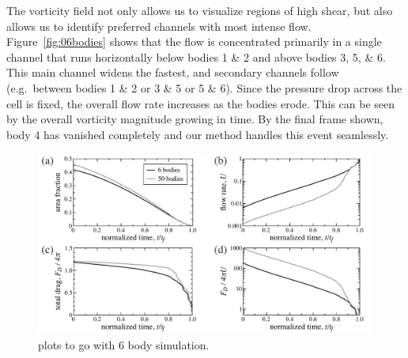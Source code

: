 \documentclass[preprint, 10pt]{elsarticle}
\begin{document}
The vorticity field not only allows us to visualize regions of high shear, but also allows us to identify preferred channels with most intense flow. Figure~\ref{fig:06bodies} shows that the flow is concentrated primarily in a single channel that runs horizontally below bodies 1 \& 2 and above bodies 3, 5, \& 6. This main channel widens the fastest, and secondary channels follow (e.g.~between bodies 1 \& 2 or 3 \& 5 or 5 \& 6). Since the pressure drop across the cell is fixed, the overall flow rate increases as the bodies erode. This can be seen by the overall vorticity magnitude growing in time. By the final frame shown, body 4 has vanished completely and our method handles this event seamlessly.

\begin{figure}%
\begin{center}
\includegraphics[width = 0.95 \textwidth]{./figs/mbodyplots.pdf}
\caption{\label{fig:mbodyplots} plots to go with 6 body simulation.
}
\end{center}
\end{figure}
\end{document}
